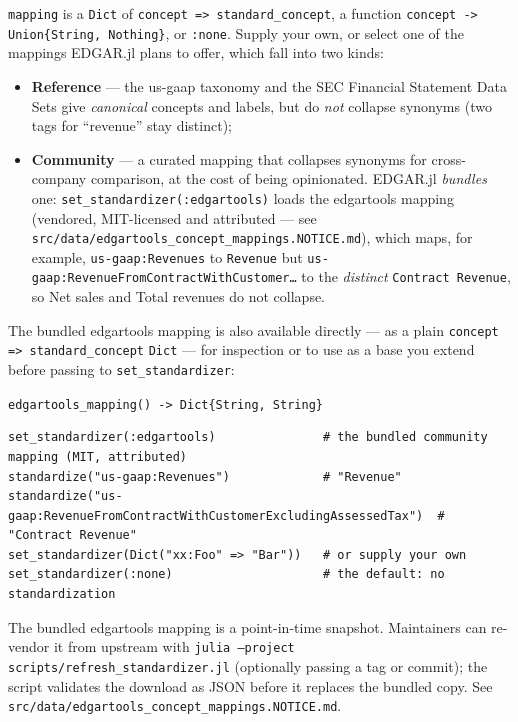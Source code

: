 \documentclass[11pt,a4paper]{report}
\newcommand{\sig}[1]{\medskip\noindent\texttt{#1}\par\medskip}
\begin{document}
\noindent \texttt{mapping} is a \texttt{Dict} of \texttt{concept => standard\_concept}, a
function \texttt{concept -> Union\{String, Nothing\}}, or \texttt{:none}. Supply your own, or
select one of the mappings EDGAR.jl plans to offer, which fall into two kinds:
\begin{itemize}
\item \textbf{Reference} --- the us-gaap taxonomy and the SEC Financial Statement Data Sets give
  \emph{canonical} concepts and labels, but do \emph{not} collapse synonyms (two tags for
  ``revenue'' stay distinct);
\item \textbf{Community} --- a curated mapping that collapses synonyms for cross-company
  comparison, at the cost of being opinionated. EDGAR.jl \emph{bundles} one:
  \texttt{set\_standardizer(:edgartools)} loads the edgartools mapping (vendored, MIT-licensed
  and attributed --- see \texttt{src/data/edgartools\_concept\_mappings.NOTICE.md}), which maps,
  for example, \texttt{us-gaap:Revenues} to \texttt{Revenue} but
  \texttt{us-gaap:RevenueFromContractWithCustomer\ldots} to the \emph{distinct}
  \texttt{Contract Revenue}, so Net sales and Total revenues do not collapse.
\end{itemize}

\noindent The bundled edgartools mapping is also available directly --- as a plain
\texttt{concept => standard\_concept} \texttt{Dict} --- for inspection or to use as a base you
extend before passing to \texttt{set\_standardizer}:

\sig{edgartools\_mapping() -> Dict\{String, String\}}

\begin{lstlisting}
set_standardizer(:edgartools)               # the bundled community mapping (MIT, attributed)
standardize("us-gaap:Revenues")             # "Revenue"
standardize("us-gaap:RevenueFromContractWithCustomerExcludingAssessedTax")  # "Contract Revenue"
set_standardizer(Dict("xx:Foo" => "Bar"))   # or supply your own
set_standardizer(:none)                     # the default: no standardization
\end{lstlisting}

\noindent The bundled edgartools mapping is a point-in-time snapshot. Maintainers can re-vendor it
from upstream with \texttt{julia --project scripts/refresh\_standardizer.jl} (optionally passing a
tag or commit); the script validates the download as JSON before it replaces the bundled copy. See
\texttt{src/data/edgartools\_concept\_mappings.NOTICE.md}.
\end{document}
